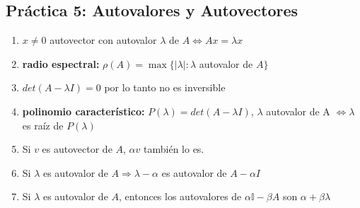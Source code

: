 \subsection*{Práctica 5: Autovalores y Autovectores}
\begin{enumerate}
    \item $x \neq 0$ autovector con autovalor $\lambda$ de $A \iff Ax = \lambda x$ 
    \item \textbf{radio espectral:} $\rho(A) = \max \{|\lambda| : \lambda$ autovalor de $A\}$
    \item $det(A-\lambda I) = 0$ por lo tanto no es inversible
    \item \textbf{polinomio característico:} $P(\lambda) = det(A-\lambda I)$, $\lambda$ autovalor de A $\iff \lambda$ es raíz de $P(\lambda)$
    \item Si $v$ es autovector de $A$, $\alpha v$ también lo es. 
    \item Si $\lambda$ es autovalor de $A \Rightarrow \lambda - \alpha$ es autovalor de $A - \alpha I$
    \item Si $\lambda$ es autovalor de $A$, entonces los autovalores de $\alpha\mathbb{I}-\beta A$ son $\alpha+\beta \lambda$ 


\end{enumerate}
